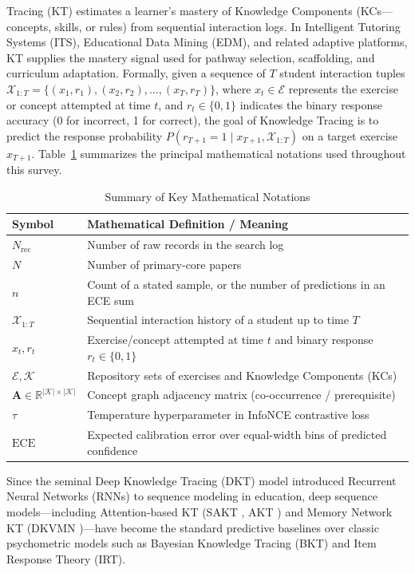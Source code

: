 \documentclass[lettersize,journal]{IEEEtran}
\begin{document}
 Tracing (KT) estimates a learner's mastery of Knowledge Components (KCs---concepts, skills, or rules) from sequential interaction logs. In Intelligent Tutoring Systems (ITS), Educational Data Mining (EDM), and related adaptive platforms, KT supplies the mastery signal used for pathway selection, scaffolding, and curriculum adaptation. Formally, given a sequence of $T$ student interaction tuples $\mathcal{X}_{1:T} = \{(x_1, r_1), (x_2, r_2), \dots, (x_T, r_T)\}$, where $x_t \in \mathcal{E}$ represents the exercise or concept attempted at time $t$, and $r_t \in \{0, 1\}$ indicates the binary response accuracy (0 for incorrect, 1 for correct), the goal of Knowledge Tracing is to predict the response probability $P(r_{T+1} = 1 \mid x_{T+1}, \mathcal{X}_{1:T})$ on a target exercise $x_{T+1}$. Table~\ref{tab:notation_summary} summarizes the principal mathematical notations used throughout this survey.
\begin{table}[t]
\caption{Summary of Key Mathematical Notations}
\label{tab:notation_summary}
\centering
\footnotesize
\begin{tabular}{@{}lp{}@{}}
\toprule
\textbf{Symbol} & \textbf{Mathematical Definition / Meaning} \\
\midrule
$N_{\mathrm{rec}}$ & Number of raw records in the search log \\
$N$ & Number of primary-core papers \\
$n$ & Count of a stated sample, or the number of predictions in an ECE sum \\
$\mathcal{X}_{1:T}$ & Sequential interaction history of a student up to time $T$ \\
$x_t, r_t$ & Exercise/concept attempted at time $t$ and binary response $r_t \in \{0,1\}$ \\
$\mathcal{E}, \mathcal{K}$ & Repository sets of exercises and Knowledge Components (KCs) \\
$\mathbf{A} \in \mathbb{R}^{|\mathcal{K}| \times |\mathcal{K}|}$ & Concept graph adjacency matrix (co-occurrence / prerequisite) \\
$\tau$ & Temperature hyperparameter in InfoNCE contrastive loss \\
$\text{ECE}$ & Expected calibration error over equal-width bins of predicted confidence \\
\bottomrule
\end{tabular}
\end{table}
Since the seminal Deep Knowledge Tracing (DKT) model \cite{Piech_DKT_2015} introduced Recurrent Neural Networks (RNNs) to sequence modeling in education, deep sequence models---including Attention-based KT (SAKT \cite{Pandey_SAKT_2019}, AKT \cite{Ghosh_AKT_2020}) and Memory Network KT (DKVMN \cite{Zhang_DKVMN_2017})---have become the standard predictive baselines over classic psychometric models such as Bayesian Knowledge Tracing (BKT) and Item Response Theory (IRT).
\end{document}
